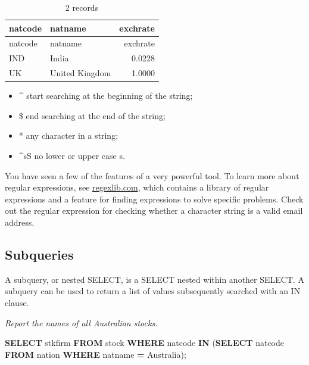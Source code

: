 \documentclass[
]{article}
\newenvironment{Shaded}{\begin{snugshade}}{\end{snugshade}}
\newcommand{\KeywordTok}[1]{\textcolor[rgb]{0.13,0.29,0.53}{\textbf{#1}}}
\newcommand{\NormalTok}[1]{#1}
\newcommand{\OperatorTok}[1]{\textcolor[rgb]{0.81,0.36,0.00}{\textbf{#1}}}
\newcommand{\StringTok}[1]{\textcolor[rgb]{0.31,0.60,0.02}{#1}}
\providecommand{\tightlist}{%
  \setlength{\itemsep}{0pt}\setlength{\parskip}{0pt}}
\begin{document}
\begin{longtable}[]{@{}llr@{}}
\caption{2 records}\tabularnewline
\toprule()
natcode & natname & exchrate \\
\midrule()
\endfirsthead
\toprule()
natcode & natname & exchrate \\
\midrule()
\endhead
IND & India & 0.0228 \\
UK & United Kingdom & 1.0000 \\
\bottomrule()
\end{longtable}

\begin{itemize}
\tightlist
\item
  \^{} start searching at the beginning of the string;
\item
  \$ end searching at the end of the string;
\item
  * any character in a string;
\item
  \^{}s\textbar S no lower or upper case s.
\end{itemize}

You have seen a few of the features of a very powerful tool. To learn
more about regular expressions, see
\href{http://regexlib.com}{regexlib.com}, which contains a library of
regular expressions and a feature for finding expressions to solve
specific problems. Check out the regular expression for checking whether
a character string is a valid email address.

\hypertarget{subqueries-1}{%
\subsection{Subqueries}\label{subqueries-1}}

A subquery, or nested SELECT, is a SELECT nested within another SELECT.
A subquery can be used to return a list of values subsequently searched
with an IN clause.

\emph{Report the names of all Australian stocks.}

\begin{Shaded}
\begin{Highlighting}[]
\KeywordTok{SELECT}\NormalTok{ stkfirm }\KeywordTok{FROM}\NormalTok{ stock}
    \KeywordTok{WHERE}\NormalTok{ natcode }\KeywordTok{IN}
\NormalTok{        (}\KeywordTok{SELECT}\NormalTok{ natcode }\KeywordTok{FROM}\NormalTok{ nation}
            \KeywordTok{WHERE}\NormalTok{ natname }\OperatorTok{=} \StringTok{\textquotesingle{}Australia\textquotesingle{}}\NormalTok{);}
\end{Highlighting}
\end{Shaded}
\end{document}
